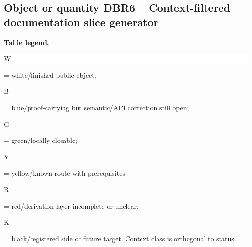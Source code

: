 \subsection*{Object or quantity DBR6 -- Context-filtered documentation slice generator}
\hypertarget{objproof:DBR6}{}
\par\smallskip\noindent\begin{minipage}{0.99\linewidth}\footnotesize\raggedright\textbf{Table legend.} \colorbox{white}{\strut W} = white/finished public object; \colorbox{cyan!20}{\strut B} = blue/proof-carrying but semantic/API correction still open; \colorbox{green!18}{\strut G} = green/locally closable; \colorbox{yellow!25}{\strut Y} = yellow/known route with prerequisites; \colorbox{red!20}{\strut R} = red/derivation layer incomplete or unclear; \colorbox{black!18}{\strut K} = black/registered side or future target. Context class is orthogonal to status.\end{minipage}\par\vspace{0.25em}

